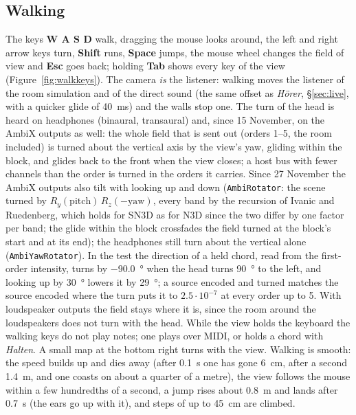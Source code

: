 \documentclass[11pt,a4paper,parskip=half,DIV=11,toc=bibliography]{scrartcl}
\newcommand{\ui}[1]{\emph{#1}}                 %
\newcommand{\fn}[1]{\mbox{\texttt{#1}}}
\begin{document}
\subsection{Walking}
The keys \textbf{W A S D} walk, dragging the mouse looks around, the left and right arrow keys turn, \textbf{Shift} runs,
\textbf{Space} jumps, the mouse wheel changes the field of view and \textbf{Esc} goes back; holding \textbf{Tab} shows every key of the view
(Figure~\ref{fig:walkkeys}). The camera \emph{is} the listener: walking moves the listener of the room simulation and of the direct sound (the
same offset as \ui{Hörer}, \S\ref{sec:live}, with a quicker glide of \SI{40}{ms}) and the walls stop one. The turn of the head is heard on
headphones (binaural, transaural) and, since 15 November, on the AmbiX outputs as well: the whole field that is sent out (orders 1--5, the room
included) is turned about the vertical axis by the view's yaw, gliding within the block, and glides back to the front when the view closes; a host bus
with fewer channels than the order is turned in the orders it carries. Since 27 November the AmbiX outputs also tilt with looking up and down
(\fn{AmbiRotator}: the scene turned by $R_y(\text{pitch})\,R_z(-\text{yaw})$, every band by the recursion of Ivanic and Ruedenberg, which holds for SN3D
as for N3D since the two differ by one factor per band; the glide within the block crossfades the field turned at the block's start and at its
end); the headphones still turn about the vertical alone (\fn{AmbiYawRotator}). In the test the direction of a held chord, read from the first-order
intensity, turns by \SI{-90.0}{\degree} when the head turns \SI{90}{\degree} to the left, and looking up by \SI{30}{\degree} lowers it by \SI{29}{\degree};
a source encoded and turned matches the source encoded where the turn puts it to $2.5\cdot10^{-7}$ at every order up to 5. With loudspeaker outputs the field stays where it is, since the room around the loudspeakers does not turn with the head. While the view holds the keyboard the
walking keys do not play notes; one plays over MIDI, or holds a chord with \ui{Halten}. A small map at the bottom right turns with the view.
Walking is smooth: the speed builds up and dies away (after \SI{0.1}{s} one has gone \SI{6}{cm}, after a second \SI{1.4}{m}, and one coasts
on about a quarter of a metre), the view follows the mouse within a few hundredths of a second, a jump rises about \SI{0.8}{m} and lands after
\SI{0.7}{s} (the ears go up with it), and steps of up to \SI{45}{cm} are climbed.
\end{document}
